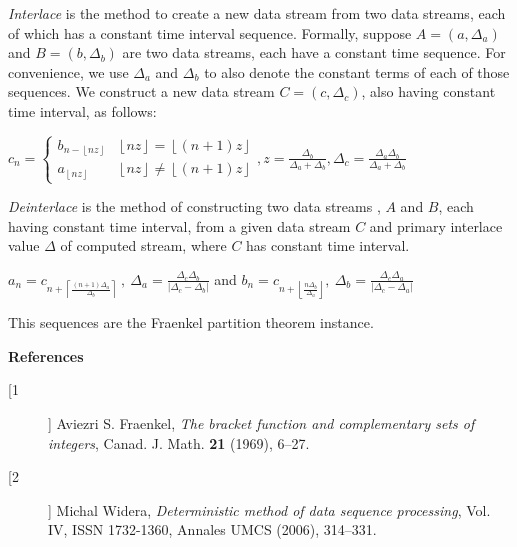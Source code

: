 \documentclass[12pt]{article}
\begin{document}
{\it Interlace} is the method to create a new data stream from
two data streams, each of which has a constant time interval sequence.
Formally, suppose $A = (a , \Delta_{a} )$ and $B = (b, \Delta_{b})$
are two data streams, each have a constant time sequence. For convenience,
we use $\Delta_{a}$ and $\Delta_{b}$ to also denote the constant terms
of each of those sequences. We construct a new data stream $C = (c, \Delta_{c})$, also having constant time interval, as follows:

$
c_{n}=\left\{
\begin{array}{cc}
b_{n-\left\lfloor n z \right\rfloor } & \left\lfloor n z
\right\rfloor =\left\lfloor \left( n+1\right) z \right\rfloor \\
a_{\left\lfloor n z \right\rfloor } & \left\lfloor n z \right\rfloor
\neq \left\lfloor \left( n+1\right) z \right\rfloor
\end{array}
\right. , z =\frac{\Delta _{b}}{\Delta _{a}+\Delta _{b}},\Delta _{c}=
\frac{\Delta _{a}\Delta _{b}}{\Delta _{a}+\Delta _{b}} \label{interlace}
$

{\it Deinterlace } is the method of constructing two data streams , $A$ and
$B$,
each having constant time interval, from a given data stream $C$ and primary interlace value $\Delta $ of computed stream, where
$C$ has constant time interval.

$
a_{n} = c_{n+ \left\lceil \frac{(n+1)\Delta _{a}}{\Delta _{b}} \right\rceil }\
,\ \Delta _{a}=\frac{\Delta _{c}\Delta _{b}}{\left\vert \Delta _{c}-\Delta _{b}\right\vert }
\label{deinterlace_a}
$
and
$
b_{n} = c_{n+\left\lfloor \frac{n\Delta _{b}}{\Delta _{a}}\right\rfloor}
,\ \Delta _{b}=\frac{\Delta _{c}\Delta _{a}}{\left\vert \Delta _{c}-\Delta_{a}\right\vert } \label{deintrlace_b}
$

This sequences are the Fraenkel partition theorem instance.

{\Huge \bf References}

\begin{description}
\item[ [1] ] Aviezri S. Fraenkel, {\em The bracket function and complementary sets of integers}, Canad. J.
Math. {\bf 21} (1969), 6--27. {\bf {}}
\item[ [2] ] Michal Widera, {\em Deterministic method of data sequence processing}, Vol. IV, ISSN 1732-1360, Annales UMCS (2006), 314--331. {\bf {}}

\end{description}
\end{document}
